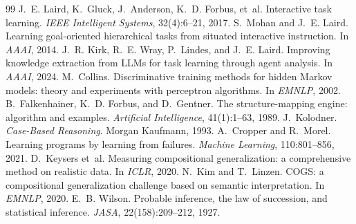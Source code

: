 \begin{thebibliography}{99}
 J.~E. Laird, K.~Gluck, J.~Anderson, K.~D. Forbus, et~al. Interactive task learning. \emph{IEEE Intelligent Systems}, 32(4):6--21, 2017.
 S.~Mohan and J.~E. Laird. Learning goal-oriented hierarchical tasks from situated interactive instruction. In \emph{AAAI}, 2014.
 J.~R. Kirk, R.~E. Wray, P.~Lindes, and J.~E. Laird. Improving knowledge extraction from LLMs for task learning through agent analysis. In \emph{AAAI}, 2024.
 M.~Collins. Discriminative training methods for hidden Markov models: theory and experiments with perceptron algorithms. In \emph{EMNLP}, 2002.
 B.~Falkenhainer, K.~D. Forbus, and D.~Gentner. The structure-mapping engine: algorithm and examples. \emph{Artificial Intelligence}, 41(1):1--63, 1989.
 J.~Kolodner. \emph{Case-Based Reasoning}. Morgan Kaufmann, 1993.
 A.~Cropper and R.~Morel. Learning programs by learning from failures. \emph{Machine Learning}, 110:801--856, 2021.
 D.~Keysers et~al. Measuring compositional generalization: a comprehensive method on realistic data. In \emph{ICLR}, 2020.
 N.~Kim and T.~Linzen. COGS: a compositional generalization challenge based on semantic interpretation. In \emph{EMNLP}, 2020.
 E.~B. Wilson. Probable inference, the law of succession, and statistical inference. \emph{JASA}, 22(158):209--212, 1927.
\end{thebibliography}
